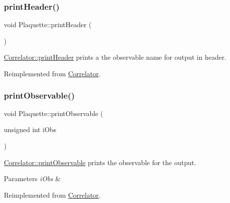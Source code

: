 \mbox{\label{class_plaquette_aef85b75fe7ce4780eeacf96c5da1b4b4}} 
\subsubsection{\texorpdfstring{printHeader()}{printHeader()}}
{\footnotesize\ttfamily void Plaquette\+::print\+Header (\begin{DoxyParamCaption}{ }\end{DoxyParamCaption})\hspace{0.3cm}{\ttfamily [virtual]}}



\mbox{\hyperlink{class_correlator_ac7c5a07d7cbee97c417a1659b93083b2}{Correlator\+::print\+Header}} prints a the observable name for output in header. 



Reimplemented from \mbox{\hyperlink{class_correlator_ac7c5a07d7cbee97c417a1659b93083b2}{Correlator}}.

\mbox{\label{class_plaquette_aa15bf42749c9fd995d4d572ca3ed4f22}} 
\subsubsection{\texorpdfstring{printObservable()}{printObservable()}}
{\footnotesize\ttfamily void Plaquette\+::print\+Observable (\begin{DoxyParamCaption}\item[{unsigned int}]{i\+Obs }\end{DoxyParamCaption})\hspace{0.3cm}{\ttfamily [virtual]}}



\mbox{\hyperlink{class_correlator_a15744ddb9f2b71fff34ac762d101df38}{Correlator\+::print\+Observable}} prints the observable for the output. 


\begin{DoxyParams}{Parameters}
{\em i\+Obs} & \\
\hline
\end{DoxyParams}


Reimplemented from \mbox{\hyperlink{class_correlator_a15744ddb9f2b71fff34ac762d101df38}{Correlator}}.

